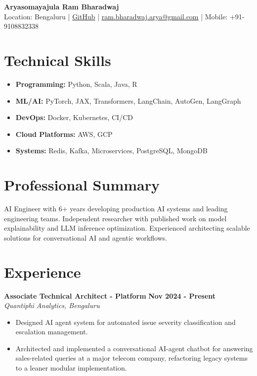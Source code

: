 \documentclass[11pt]{article}
\begin{document}
\begin{center}
\textbf{\Large Aryasomayajula Ram Bharadwaj} \\
\vspace{4pt}
Location: Bengaluru | \href{https://github.com/rokosbasilisk}{GitHub} | \href{mailto:ram.bharadwaj.arya@gmail.com}{ram.bharadwaj.arya@gmail.com} | Mobile: +91-9108832338
\end{center}

\vspace{12pt}

\section{Technical Skills}
\begin{itemize}[leftmargin=*, nosep]
\item \textbf{Programming:} Python, Scala, Java, R
\item \textbf{ML/AI:} PyTorch, JAX, Transformers, LangChain, AutoGen, LangGraph
\item \textbf{DevOps:} Docker, Kubernetes, CI/CD
\item \textbf{Cloud Platforms:} AWS, GCP
\item \textbf{Systems:} Redis, Kafka, Microservices, PostgreSQL, MongoDB
\end{itemize}

\section{Professional Summary}
AI Engineer with 6+ years developing production AI systems and leading engineering teams. Independent researcher with published work on model explainability and LLM inference optimization. Experienced architecting scalable solutions for conversational AI and agentic workflows.

\section{Experience}

\textbf{Associate Technical Architect - Platform} \hfill \textbf{Nov 2024 - Present} \\
\textit{Quantiphi Analytics, Bengaluru}
\begin{itemize}[leftmargin=*, nosep]
\item Designed AI agent system for automated issue severity classification and escalation management.
\item Architected and implemented a conversational AI-agent chatbot for answering sales-related queries at a major telecom company, refactoring legacy systems to a leaner modular implementation.
\end{itemize}
\end{document}
